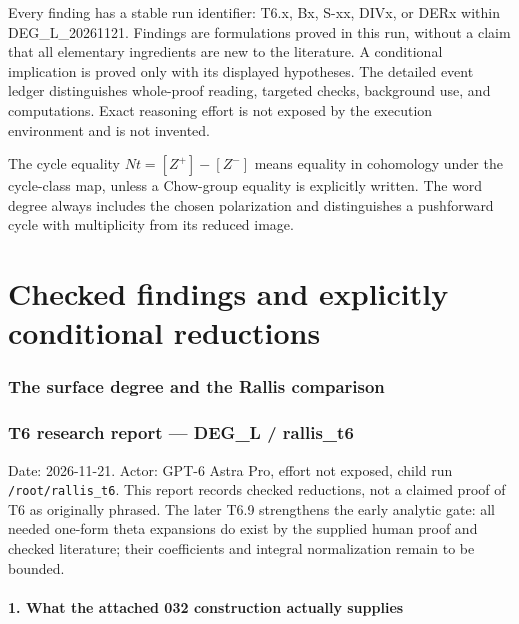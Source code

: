 \documentclass[11pt,a4paper]{article}
\providecommand{\tightlist}{\setlength{\itemsep}{0pt}\setlength{\parskip}{0pt}}
\theoremstyle{definition}
\begin{document}
Every finding has a stable run identifier: T6.x, Bx, S-xx, DIVx, or DERx within
DEG\_L\_20261121. Findings are formulations proved in this run, without a
claim that all elementary ingredients are new to the literature. A
conditional implication is proved only with its displayed hypotheses.
The detailed event ledger distinguishes whole-proof reading, targeted
checks, background use, and computations. Exact reasoning effort is not
exposed by the execution environment and is not invented.

The cycle equality $Nt=[Z^+]-[Z^-]$ means equality in cohomology under the
cycle-class map, unless a Chow-group equality is explicitly written. The
word degree always includes the chosen polarization and distinguishes a
pushforward cycle with multiplicity from its reduced image.

\part{Checked findings and explicitly conditional reductions}

\section{The surface degree and the Rallis comparison}

\providecommand{\tightlist}{\setlength{\itemsep}{0pt}\setlength{\parskip}{0pt}}
\providecommand{\passthrough}[1]{#1}
\section{T6 research report --- DEG\_L / rallis\_t6}\label{t6-research-report-deg_l-rallis_t6}

Date: 2026-11-21. Actor: GPT-6 Astra Pro, effort not exposed, child run \texttt{/root/rallis\_t6}. This report records checked reductions, not a claimed proof of T6 as originally phrased. The later T6.9 strengthens the early analytic gate: all needed one-form theta expansions do exist by the supplied human proof and checked literature; their coefficients and integral normalization remain to be bounded.

\subsection{1. What the attached 032 construction actually supplies}\label{what-the-attached-032-construction-actually-supplies}
\end{document}

